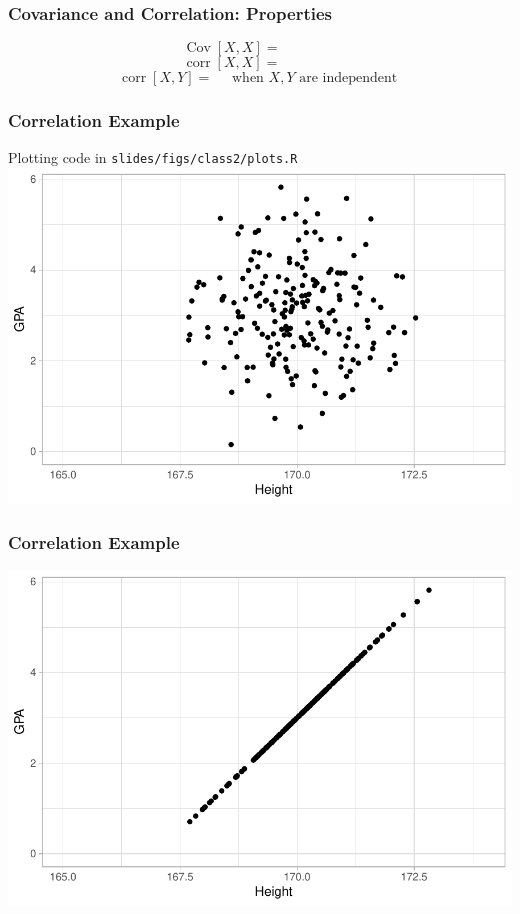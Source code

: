 \documentclass{beamer}
\newcommand{\cov}[1]{\operatorname{Cov}\left[#1\right]}
\newcommand{\corr}[1]{\operatorname{corr}\left[#1\right]}
\begin{document}
\begin{frame} \frametitle{Covariance and Correlation: Properties}
  \[ \cov{ X,X } =  \qquad  \qquad \]
  \vfill
  \[ \corr{ X,X } =  \qquad \qquad  \]
  \vfill
  \[ \corr{ X,Y } = \quad  \text{ when } X,Y \text{ are independent } \]
\end{frame}

\begin{frame} \frametitle{Correlation Example}
    \centering
    {\tiny Plotting code in \texttt{slides/figs/class2/plots.R}}
    \includegraphics[width=0.8\linewidth]{../figs/class2/students_example0.pdf} \\[3mm]
\end{frame}

\begin{frame} \frametitle{Correlation Example}
    \centering
    \includegraphics[width=0.8\linewidth]{../figs/class2/students_example1.pdf} \\[3mm]
\end{frame}
\end{document}
